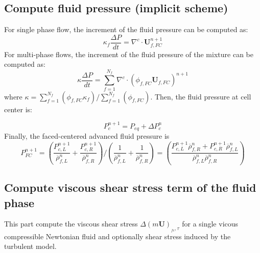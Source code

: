\documentclass[preprint,12pt]{elsarticle}
\begin{document}
\subsection{\textsf{Compute fluid pressure (implicit scheme)}}
For single phase flow, the increment of the fluid pressure can be computed as:
%
\begin{equation}
  \kappa_f \frac{\Delta P}{dt} = \nabla^c \cdot \pmb{U}_{f,FC}^{n+1}
\end {equation}
%
For multi-phase flows, the increment of the fluid pressure of the mixture can be computed as:
%
\begin{equation}
  \kappa \frac{\Delta P}{dt} = \sum_{f=1}^{N_f}  \nabla^c \cdot (\phi_{f,FC} \pmb{U}_{f,FC})^{n+1}
\end {equation}
%
where $\kappa =  \sum_{f=1}^{N_f}  (\phi_{f,FC} \kappa_f) / \sum_{f=1}^{N_f}  (\phi_{f,FC})$. Then, the fluid pressure at cell center is:

\begin{equation}
  P_c^{n+1} = P_{eq} + \Delta P_c^{n}
\end {equation}
%
%
%
%
%
%
%
%
Finally, the faced-centered advanced fluid pressure is
%
%
\begin{equation}
    P_{FC}^{n+1} = (\frac{P_{c,L}^{n+1}}{\overline{\rho}_{f,L}^n} + \frac{P_{c,R}^{n+1}}{\overline{\rho}_{f,R}^n}) / (\frac{1}{\overline{\rho}_{f,L}^n} + \frac{1}{\overline{\rho}_{f,R}^n}) = (\frac{P_{c,L}^{n+1} \overline{\rho}_{f,R}^n + P_{c,R}^{n+1} \overline{\rho}_{f,L}^n}{\overline{\rho}_{f,L}^n \overline{\rho}_{f,R}^n})
\end {equation}
%
%
\subsection{\textsf{Compute viscous shear stress term of the fluid phase}}
This part compute the viscous shear stress $\Delta (m \pmb{U})_{_{fc},\tau}$ for a single vicous compressible Newtonian fluid and optionally shear stress induced by the turbulent model.
%
%
\end{document}
